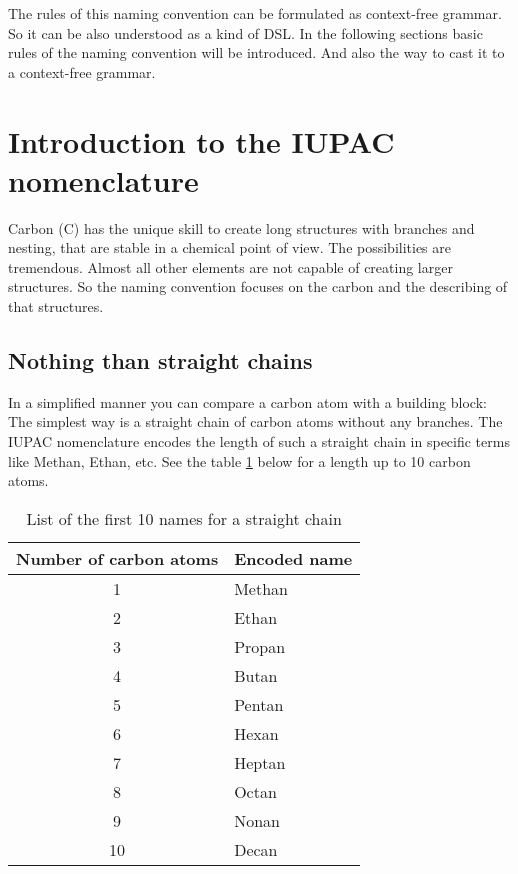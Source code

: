 \documentclass[a4paper,10pt]{article}
\newcommand{\gerquot}[1]{\glqq#1\grqq}
\newcommand{\dashAndSpace}{\textendash \space}
\newcommand{\CFG}{context-free grammar}
\newcommand{\captionVSpace}{\vspace*{-0.05cm}}
\begin{document}
The rules of this naming convention can be formulated as \CFG. So it can be also understood as a kind of DSL. In the following sections basic rules of the naming convention will be introduced. And also the way to cast it to a \CFG.



\section{Introduction to the IUPAC nomenclature}\label{s:IntroductionToTheIUPACNomenclature}
Carbon (C) has the unique skill to create long structures with branches and nesting, that are stable \dashAndSpace in a chemical point of view. The possibilities are tremendous. Almost all other elements are not capable of creating larger structures. So the naming convention focuses on the carbon and the describing of that structures.

\subsection{Nothing than straight chains}\label{ss:NothingThanStraightChains}
In a simplified manner you can compare a carbon atom with a building block: The simplest way is a straight chain of carbon atoms without any branches. The IUPAC nomenclature encodes the length of such a straight chain in specific terms like \gerquot{Methan}, \gerquot{Ethan}, etc. See the table \ref{tab:NumCarbonEncodedName} below for a length up to 10 carbon atoms.

\begin{table}[H]
    \centering
    \begin{tabular}{c|l}
        \toprule
        \textbf{Number of carbon atoms} & \textbf{Encoded name} \\
        \midrule
        1 & Methan \\
        2 & Ethan \\
        3 & Propan \\
        4 & Butan \\
        5 & Pentan \\
        6 & Hexan \\
        7 & Heptan \\
        8 & Octan \\
        9 & Nonan \\
        10 & Decan \\
        \bottomrule
    \end{tabular}
    \captionVSpace
    \caption{List of the first 10 names for a straight chain}
    \label{tab:NumCarbonEncodedName}
\end{table}
\end{document}
